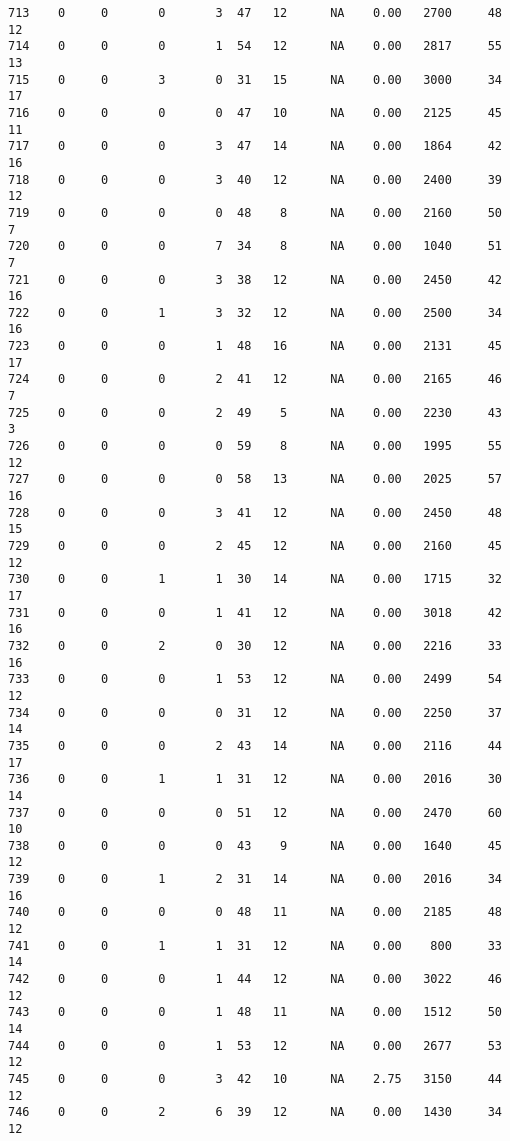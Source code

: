 \documentclass[
  letterpaper,
  DIV=11,
  numbers=noendperiod]{scrreprt}
\begin{document}
\begin{verbatim}
713    0     0       0       3  47   12      NA    0.00   2700     48      12
714    0     0       0       1  54   12      NA    0.00   2817     55      13
715    0     0       3       0  31   15      NA    0.00   3000     34      17
716    0     0       0       0  47   10      NA    0.00   2125     45      11
717    0     0       0       3  47   14      NA    0.00   1864     42      16
718    0     0       0       3  40   12      NA    0.00   2400     39      12
719    0     0       0       0  48    8      NA    0.00   2160     50       7
720    0     0       0       7  34    8      NA    0.00   1040     51       7
721    0     0       0       3  38   12      NA    0.00   2450     42      16
722    0     0       1       3  32   12      NA    0.00   2500     34      16
723    0     0       0       1  48   16      NA    0.00   2131     45      17
724    0     0       0       2  41   12      NA    0.00   2165     46       7
725    0     0       0       2  49    5      NA    0.00   2230     43       3
726    0     0       0       0  59    8      NA    0.00   1995     55      12
727    0     0       0       0  58   13      NA    0.00   2025     57      16
728    0     0       0       3  41   12      NA    0.00   2450     48      15
729    0     0       0       2  45   12      NA    0.00   2160     45      12
730    0     0       1       1  30   14      NA    0.00   1715     32      17
731    0     0       0       1  41   12      NA    0.00   3018     42      16
732    0     0       2       0  30   12      NA    0.00   2216     33      16
733    0     0       0       1  53   12      NA    0.00   2499     54      12
734    0     0       0       0  31   12      NA    0.00   2250     37      14
735    0     0       0       2  43   14      NA    0.00   2116     44      17
736    0     0       1       1  31   12      NA    0.00   2016     30      14
737    0     0       0       0  51   12      NA    0.00   2470     60      10
738    0     0       0       0  43    9      NA    0.00   1640     45      12
739    0     0       1       2  31   14      NA    0.00   2016     34      16
740    0     0       0       0  48   11      NA    0.00   2185     48      12
741    0     0       1       1  31   12      NA    0.00    800     33      14
742    0     0       0       1  44   12      NA    0.00   3022     46      12
743    0     0       0       1  48   11      NA    0.00   1512     50      14
744    0     0       0       1  53   12      NA    0.00   2677     53      12
745    0     0       0       3  42   10      NA    2.75   3150     44      12
746    0     0       2       6  39   12      NA    0.00   1430     34      12

\end{verbatim}
\end{document}
